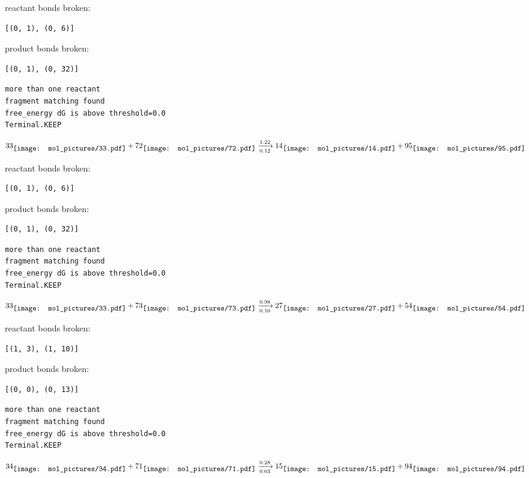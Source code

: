\documentclass{article}
\begin{document}
reactant bonds broken:\begin{verbatim}
[(0, 1), (0, 6)]
\end{verbatim}
product bonds broken:\begin{verbatim}
[(0, 1), (0, 32)]
\end{verbatim}




\vspace{1cm}
\begin{verbatim}
more than one reactant
fragment matching found
free_energy dG is above threshold=0.0
Terminal.KEEP
\end{verbatim}
$$
33
\raisebox{-.5\height}{\texttt{[image: mol\_pictures/33.pdf]}}
+
72
\raisebox{-.5\height}{\texttt{[image: mol\_pictures/72.pdf]}}
\xrightarrow[0.12]{1.22}
14
\raisebox{-.5\height}{\texttt{[image: mol\_pictures/14.pdf]}}
+
95
\raisebox{-.5\height}{\texttt{[image: mol\_pictures/95.pdf]}}
$$


reactant bonds broken:\begin{verbatim}
[(0, 1), (0, 6)]
\end{verbatim}
product bonds broken:\begin{verbatim}
[(0, 1), (0, 32)]
\end{verbatim}




\vspace{1cm}
\begin{verbatim}
more than one reactant
fragment matching found
free_energy dG is above threshold=0.0
Terminal.KEEP
\end{verbatim}
$$
33
\raisebox{-.5\height}{\texttt{[image: mol\_pictures/33.pdf]}}
+
73
\raisebox{-.5\height}{\texttt{[image: mol\_pictures/73.pdf]}}
\xrightarrow[0.10]{0.98}
27
\raisebox{-.5\height}{\texttt{[image: mol\_pictures/27.pdf]}}
+
54
\raisebox{-.5\height}{\texttt{[image: mol\_pictures/54.pdf]}}
$$


reactant bonds broken:\begin{verbatim}
[(1, 3), (1, 10)]
\end{verbatim}
product bonds broken:\begin{verbatim}
[(0, 0), (0, 13)]
\end{verbatim}




\vspace{1cm}
\begin{verbatim}
more than one reactant
fragment matching found
free_energy dG is above threshold=0.0
Terminal.KEEP
\end{verbatim}
$$
34
\raisebox{-.5\height}{\texttt{[image: mol\_pictures/34.pdf]}}
+
71
\raisebox{-.5\height}{\texttt{[image: mol\_pictures/71.pdf]}}
\xrightarrow[0.03]{0.28}
15
\raisebox{-.5\height}{\texttt{[image: mol\_pictures/15.pdf]}}
+
94
\raisebox{-.5\height}{\texttt{[image: mol\_pictures/94.pdf]}}
$$
\end{document}
